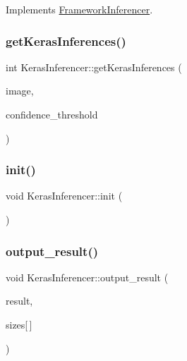 Implements \hyperlink{class_framework_inferencer_a8fd7e708c8be4471bc2b37a4193a9045}{Framework\+Inferencer}.

\mbox{\label{class_keras_inferencer_adb1b0ad044dd344be3d12df018db589c}} 
\subsubsection{\texorpdfstring{get\+Keras\+Inferences()}{getKerasInferences()}}
{\footnotesize\ttfamily int Keras\+Inferencer\+::get\+Keras\+Inferences (\begin{DoxyParamCaption}\item[{const cv\+::\+Mat \&}]{image,  }\item[{double}]{confidence\+\_\+threshold }\end{DoxyParamCaption})}

\mbox{\label{class_keras_inferencer_a98f3d1bdf1e3207e44602312c04c6e98}} 
\subsubsection{\texorpdfstring{init()}{init()}}
{\footnotesize\ttfamily void Keras\+Inferencer\+::init (\begin{DoxyParamCaption}{ }\end{DoxyParamCaption})\hspace{0.3cm}{\ttfamily [static]}}

\mbox{\label{class_keras_inferencer_a954532264ddadbee70c7c4bdb7b55ed3}} 
\subsubsection{\texorpdfstring{output\+\_\+result()}{output\_result()}}
{\footnotesize\ttfamily void Keras\+Inferencer\+::output\+\_\+result (\begin{DoxyParamCaption}\item[{Py\+Object $\ast$}]{result,  }\item[{int}]{sizes\mbox{[}$\,$\mbox{]} }\end{DoxyParamCaption})}



